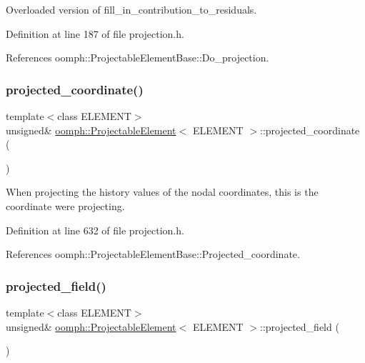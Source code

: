 Overloaded version of fill\+\_\+in\+\_\+contribution\+\_\+to\+\_\+residuals. 



Definition at line 187 of file projection.\+h.



References oomph\+::\+Projectable\+Element\+Base\+::\+Do\+\_\+projection.

\mbox{\label{classoomph_1_1ProjectableElement_a4b63733bc82062bf26be9ea0d18a7c08}} 
\subsubsection{\texorpdfstring{projected\+\_\+coordinate()}{projected\_coordinate()}}
{\footnotesize\ttfamily template$<$class E\+L\+E\+M\+E\+NT$>$ \\
unsigned\& \hyperlink{classoomph_1_1ProjectableElement}{oomph\+::\+Projectable\+Element}$<$ E\+L\+E\+M\+E\+NT $>$\+::projected\+\_\+coordinate (\begin{DoxyParamCaption}{ }\end{DoxyParamCaption})\hspace{0.3cm}{\ttfamily [inline]}}



When projecting the history values of the nodal coordinates, this is the coordinate we\textquotesingle{}re projecting. 



Definition at line 632 of file projection.\+h.



References oomph\+::\+Projectable\+Element\+Base\+::\+Projected\+\_\+coordinate.

\mbox{\label{classoomph_1_1ProjectableElement_a1d5640979b055e358f10c5a4b8cfb3b3}} 
\subsubsection{\texorpdfstring{projected\+\_\+field()}{projected\_field()}}
{\footnotesize\ttfamily template$<$class E\+L\+E\+M\+E\+NT$>$ \\
unsigned\& \hyperlink{classoomph_1_1ProjectableElement}{oomph\+::\+Projectable\+Element}$<$ E\+L\+E\+M\+E\+NT $>$\+::projected\+\_\+field (\begin{DoxyParamCaption}{ }\end{DoxyParamCaption})\hspace{0.3cm}{\ttfamily [inline]}}




